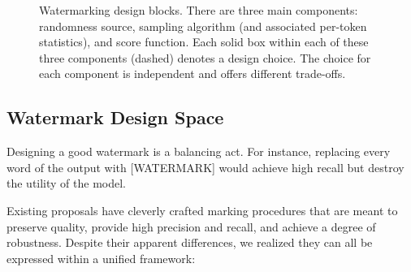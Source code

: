 \begin{figure*}
\begin{center}
    \caption{Watermarking design blocks. There are three main components: randomness source, sampling algorithm (and associated per-token statistics), and score function. Each solid box within each of these three components (dashed) denotes a design choice. The choice for each component is independent and offers different trade-offs.}\label{fig:design-figure}
    \end{center}
    \end{figure*}

\subsection{Watermark Design Space}
\label{sec:watermark-design}

Designing a good watermark is a balancing act.
% 
For instance, replacing every word of the output with [WATERMARK] would achieve high recall but destroy the utility of the model.
%

Existing proposals have cleverly crafted marking procedures that are meant to preserve quality, provide high precision and recall, and achieve a degree of robustness.
%
Despite their apparent differences, we realized they can all be expressed within a unified framework:

